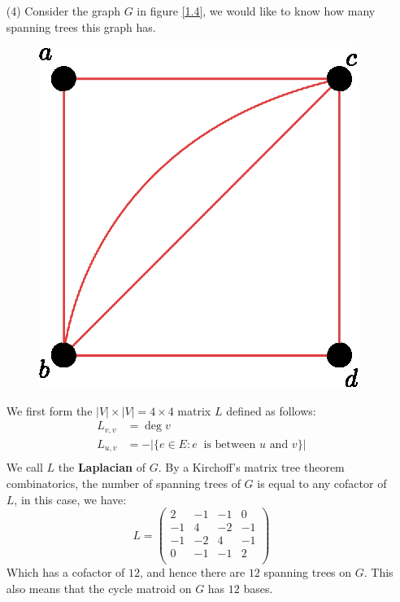 \begin{example}
\begin{enumerate}
            \item[(4)] Consider the graph $G$ in figure \ref{1.4}, we would like
                to know how many spanning trees this graph has.
                 \begin{figure}[h]
                    \centering
                    \includegraphics[scale=0.5]{Figures/Chapter1/matrix_tree.eps}
                    \caption{}
                    \label{fig_1.4}
                \end{figure}

                We first form the $|V| \times |V|=4 \times 4$ matrix $L$ defined
                as follows:
                \begin{align*}
                    L_{v,v} &= \deg{v} \\
                    L_{u,v} &= -|\{e \in E : e\ \text{ is between } u \text{ and
                    } v\}|\\
                \end{align*}
                We call $L$ the  \textbf{Laplacian} of $G$. By a Kirchoff's
                matrix tree theorem combinatorics, the number of spanning trees
                of  $G$ is equal to any cofactor of  $L$, in this case, we have:
                \begin{equation*}
                    L=\begin{pmatrix}
                        2   &   -1  &   -1  &   0   \\
                       -1   &    4  &   -2  &  -1   \\
                       -1   &   -2  &    4  &  -1   \\
                        0   &   -1  &   -1  &   2   \\
                      \end{pmatrix}
                \end{equation*}
                Which has a cofactor of $12$, and hence there are $12$ spanning
                trees on  $G$. This also means that the cycle matroid on $G$ has
                 $12$ bases.
    \end{enumerate}
\end{example}

